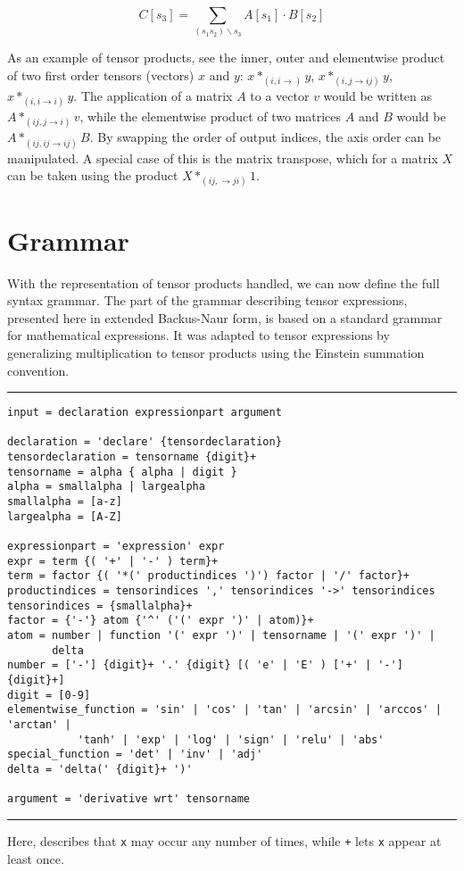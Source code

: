 \documentclass[12pt, a4paper]{report} %
\begin{document}
\begin{equation}
    C[s_3] = \sum_{(s_1 s_2)  \backslash s_3} A[s_1] \cdot B[s_2]
    \label{eq:product}
\end{equation}

As an example of tensor products, see the inner, outer and elementwise product of two first order tensors (vectors) $x$ and $y$: $x*_{(i,i \rightarrow)}y$, $x*_{(i,j \rightarrow ij)}y$, $x*_{(i,i \rightarrow i)}y$.
The application of a matrix $A$ to a vector $v$ would be written as $A*_{(ij,j \rightarrow i)}v$, while the elementwise product of two matrices $A$ and $B$ would be $A*_{(ij,ij \rightarrow ij)}B$.
By swapping the order of output indices, the axis order can be manipulated.
A special case of this is the matrix transpose, which for a matrix $X$ can be taken using the product $X *_{(ij, \rightarrow ji)} 1$.

\section{Grammar}
With the representation of tensor products handled, we can now define the full syntax grammar.
The part of the grammar describing tensor expressions, presented here in extended Backus-Naur form, is based on a standard grammar for mathematical expressions.
It was adapted to tensor expressions by generalizing multiplication to tensor products using the Einstein summation convention.

\rule[-2pt]{\textwidth}{0.5pt}
{
\small
\begin{verbatim}
input = declaration expressionpart argument

declaration = 'declare' {tensordeclaration}
tensordeclaration = tensorname {digit}+
tensorname = alpha { alpha | digit }
alpha = smallalpha | largealpha
smallalpha = [a-z]
largealpha = [A-Z]

expressionpart = 'expression' expr
expr = term {( '+' | '-' ) term}+
term = factor {( '*(' productindices ')') factor | '/' factor}+
productindices = tensorindices ',' tensorindices '->' tensorindices
tensorindices = {smallalpha}+
factor = {'-'} atom {'^' ('(' expr ')' | atom)}+
atom = number | function '(' expr ')' | tensorname | '(' expr ')' | 
       delta
number = ['-'] {digit}+ '.' {digit} [( 'e' | 'E' ) ['+' | '-'] {digit}+]
digit = [0-9]
elementwise_function = 'sin' | 'cos' | 'tan' | 'arcsin' | 'arccos' | 'arctan' | 
           'tanh' | 'exp' | 'log' | 'sign' | 'relu' | 'abs'
special_function = 'det' | 'inv' | 'adj'
delta = 'delta(' {digit}+ ')' 

argument = 'derivative wrt' tensorname
\end{verbatim}
}
\rule[8pt]{\textwidth}{0.1pt}
Here, \texttt{} describes that \texttt{x} may occur any number of times, while \texttt{+} lets \texttt{x} appear at least once.
\end{document}

